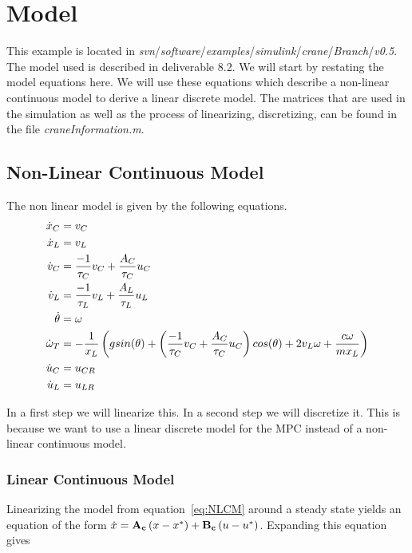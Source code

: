 \documentclass[12pt]{article}
\begin{document}
\maketitle

\section{Model}
This example is located in \emph{svn}/\emph{software}/\emph{examples}/\emph{simulink}/\emph{crane}/\emph{Branch}/\emph{v0.5}. The model used is described in deliverable 8.2. We will start by restating the model equations here. We will use these equations which describe a non-linear continuous model to derive a linear discrete model. The matrices that are used in the simulation as well as the process of linearizing, discretizing, can be found in the file \emph{craneInformation.m}.

\subsection{Non-Linear Continuous Model}
The non linear model is given by the following equations.
\begin{equation}
\begin{aligned}
	\dot{x}_C &= v_C \\
	\dot{x}_L &= v_L \\
	\dot{v}_C &= \frac{-1}{\tau_C}\*v_C + \frac{A_C}{\tau_C}\*u_C \\
	\dot{v}_L &= \frac{-1}{\tau_L}\*v_L + \frac{A_L}{\tau_L}\*u_L \\
	\dot{\theta} &= \omega \\
	\dot{\omega}_T &= - \frac{1}{x_L} \left( g\*sin(\theta) + \left( \frac{-1}{\tau_C} \* v_C + \frac{A_C}{\tau_C} \*u_C \right) \* cos(\theta) + 2\*v_L\*\omega + \frac{c\*\omega}{m\*x_L} \right) \\
	\dot{u}_{C} &= u_{CR} \\
	\dot{u}_{L} &= u_{LR} \\
\end{aligned}
\label{eq:NLCM}
\end{equation}

In a first step we will linearize this. In a second step we will discretize it. This is because we want to use a linear discrete model for the MPC instead of a non-linear continuous model.

\subsubsection{Linear Continuous Model}
Linearizing the model from equation~\ref{eq:NLCM} around a steady state yields an equation of the form $\dot{x} = \mathbf{A_c} \* \left( x - x^* \right) + \mathbf{B_c} \* \left( u - u^* \right)$. Expanding this equation gives
\end{document}
